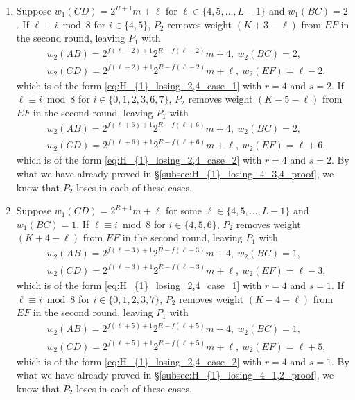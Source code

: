 \documentclass[11pt,reqno]{amsart}
\theoremstyle{definition}
\theoremstyle{definition}
\begin{document}
\begin{enumerate}
\begin{enumerate}
\item Suppose $w_{1}(CD)=2^{R+1}m+\ell$ for $\ell \in \{4,5,\ldots,L-1\}$ and $w_{1}(BC)=2$. If $\ell \equiv i\bmod 8$ for $i \in \{4,5\}$, $P_{2}$ removes weight $(K+3-\ell)$ from $EF$ in the second round, leaving $P_{1}$ with
\begin{align}
{}&w_{2}(AB)=2^{f(\ell-2)+1}2^{R-f(\ell-2)}m+4,\ w_{2}(BC)=2,\nonumber\\
{}&w_{2}(CD)=2^{f(\ell-2)+1}2^{R-f(\ell-2)}m+\ell,\ w_{2}(EF)=\ell-2,\nonumber
\end{align}
which is of the form \eqref{eq:H_{1}_losing_2,4_case_1} with $r=4$ and $s=2$. If $\ell \equiv i \bmod 8$ for $i \in \{0,1,2,3,6,7\}$, $P_{2}$ removes weight $(K-5-\ell)$ from $EF$ in the second round, leaving $P_{1}$ with
\begin{align}
{}&w_{2}(AB)=2^{f(\ell+6)+1}2^{R-f(\ell+6)}m+4,\ w_{2}(BC)=2,\nonumber\\
{}&w_{2}(CD)=2^{f(\ell+6)+1}2^{R-f(\ell+6)}m+\ell,\ w_{2}(EF)=\ell+6,\nonumber
\end{align}
which is of the form \eqref{eq:H_{1}_losing_2,4_case_2} with $r=4$ and $s=2$. By what we have already proved in \S\ref{subsec:H_{1}_losing_4_3,4_proof}, we know that $P_{2}$ loses in each of these cases.

\item Suppose $w_{1}(CD)=2^{R+1}m+\ell$ for some $\ell \in \{4,5,\ldots,L-1\}$ and $w_{1}(BC)=1$. If $\ell \equiv i\bmod 8$ for $i \in \{4,5,6\}$, $P_{2}$ removes weight $(K+4-\ell)$ from $EF$ in the second round, leaving $P_{1}$ with
\begin{align}
{}&w_{2}(AB)=2^{f(\ell-3)+1}2^{R-f(\ell-3)}m+4,\ w_{2}(BC)=1,\nonumber\\
{}&w_{2}(CD)=2^{f(\ell-3)+1}2^{R-f(\ell-3)}m+\ell,\ w_{2}(EF)=\ell-3,\nonumber
\end{align}
which is of the form \eqref{eq:H_{1}_losing_2,4_case_1} with $r=4$ and $s=1$. If $\ell \equiv i \bmod 8$ for $i \in \{0,1,2,3,7\}$, $P_{2}$ removes weight $(K-4-\ell)$ from $EF$ in the second round, leaving $P_{1}$ with
\begin{align}
{}&w_{2}(AB)=2^{f(\ell+5)+1}2^{R-f(\ell+5)}m+4,\ w_{2}(BC)=1,\nonumber\\
{}&w_{2}(CD)=2^{f(\ell+5)+1}2^{R-f(\ell+5)}m+\ell,\ w_{2}(EF)=\ell+5,\nonumber
\end{align}
which is of the form \eqref{eq:H_{1}_losing_2,4_case_2} with $r=4$ and $s=1$. By what we have already proved in \S\ref{subsec:H_{1}_losing_4_1,2_proof}, we know that $P_{2}$ loses in each of these cases.


\end{enumerate}
\end{enumerate}
\end{document}
